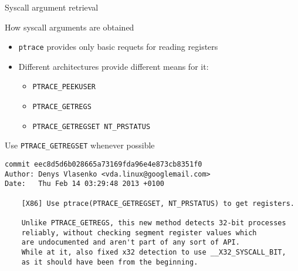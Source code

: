 \documentclass[unicode]{beamer}
\begin{document}
\begin{frame}[fragile]{Syscall argument retrieval}
\begin{block}{\large How syscall arguments are obtained}
\begin{itemize}
  \item \texttt{ptrace} provides only basic requets for reading registers\footnotemark[1]
  \item Different architectures provide different means for it:
  \begin{itemize}
    \item \texttt{PTRACE\_PEEKUSER}
    \item \texttt{PTRACE\_GETREGS}
    \item \texttt{PTRACE\_GETREGSET NT\_PRSTATUS}
  \end{itemize}
\end{itemize}
\end{block}
\pause
\begin{block}{\large Use \texttt{PTRACE\_GETREGSET} whenever possible}
\begin{scriptsize}
\begin{verbatim}
commit eec8d5d6b028665a73169fda96e4e873cb8351f0
Author: Denys Vlasenko <vda.linux@googlemail.com>
Date:   Thu Feb 14 03:29:48 2013 +0100

    [X86] Use ptrace(PTRACE_GETREGSET, NT_PRSTATUS) to get registers.
    
    Unlike PTRACE_GETREGS, this new method detects 32-bit processes
    reliably, without checking segment register values which
    are undocumented and aren't part of any sort of API.
    While at it, also fixed x32 detection to use __X32_SYSCALL_BIT,
    as it should have been from the beginning.
\end{verbatim}
\end{scriptsize}
\end{block}
\end{frame}
\end{document}
